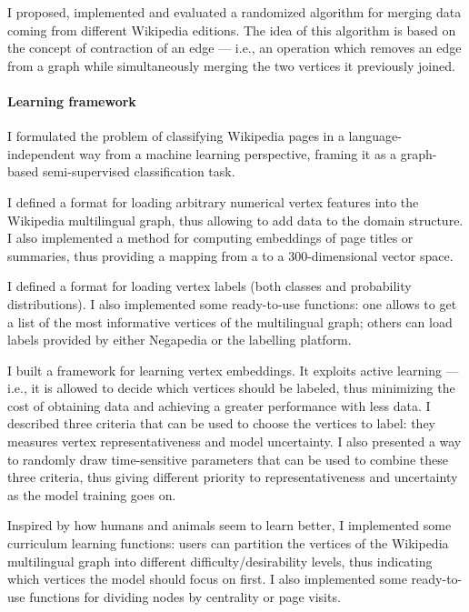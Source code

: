             I proposed, implemented and evaluated a randomized algorithm for merging data coming from different Wikipedia editions. The idea of this algorithm is based on the concept of contraction of an edge --- i.e., an operation which removes an edge from a graph while simultaneously merging the two vertices it previously joined.
        \paragraph{Learning framework}
            I formulated the problem of classifying Wikipedia pages in a language-independent way from a machine learning perspective, framing it as a graph-based semi-supervised classification task.
            
            I defined a format for loading arbitrary numerical vertex features into the Wikipedia multilingual graph, thus allowing to add data to the domain structure. I also implemented a method for computing embeddings of page titles or summaries, thus providing a mapping from a  to a 300-dimensional vector space.
            
            I defined a format for loading vertex labels (both classes and probability distributions). I also implemented some ready-to-use functions: one allows to get a list of the most informative vertices of the multilingual graph; others can load labels provided by either Negapedia or the labelling platform.
            
            I built a framework for learning vertex embeddings. It exploits active learning --- i.e., it is allowed to decide which vertices should be labeled, thus minimizing the cost of obtaining data and achieving a greater performance with less data. I described three criteria that can be used to choose the vertices to label: they measures vertex representativeness and model uncertainty. I also presented a way to randomly draw time-sensitive parameters that can be used to combine these three criteria, thus giving different priority to representativeness and uncertainty as the model training goes on.
            
            Inspired by how humans and animals seem to learn better, I implemented some curriculum learning functions: users can partition the vertices of the Wikipedia multilingual graph into different difficulty/desirability levels, thus indicating which vertices the model should focus on first. I also implemented some ready-to-use functions for dividing nodes by centrality or page visits.
            
